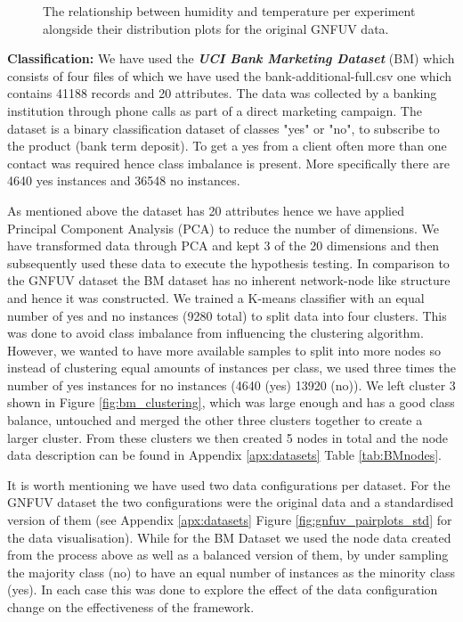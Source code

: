 \documentclass{mpaper}
\begin{document}
\begin{figure}
\begin{center}
\end{center}
\caption{\label{fig:gnfuv_pairplots} The relationship between humidity and temperature per experiment alongside their distribution plots for the original GNFUV data.}
\end{figure}


\textbf{Classification:} We have used the \textbf{\textit{UCI Bank Marketing Dataset}} (BM) \cite{BMDataset} which consists of four files of which we have used the bank-additional-full.csv one which contains 41188 records and 20 attributes. The data was collected by a banking institution through phone calls as part of a direct marketing campaign. The dataset is a binary classification dataset of classes "yes" or "no", to subscribe to the product (bank term deposit). To get a yes from a client often more than one contact was required hence class imbalance is present. More specifically there are 4640 yes instances and 36548 no instances. 

As mentioned above the dataset has 20 attributes hence we have applied Principal Component Analysis (PCA) to reduce the number of dimensions. We have transformed data through PCA and kept 3 of the 20 dimensions and then subsequently used these data to execute the hypothesis testing. In comparison to the GNFUV dataset the BM dataset has no inherent network-node like structure and hence it was constructed. We trained a K-means classifier with an equal number of yes and no instances (9280 total) to split data into four clusters. This was done to avoid class imbalance from influencing the clustering algorithm. However, we wanted to have more available samples to split into more nodes so instead of clustering equal amounts of instances per class, we used three times the number of yes instances for no instances (4640 (yes) 13920 (no)). We left cluster 3 shown in Figure \ref{fig:bm_clustering}, which was large enough and has a good class balance, untouched and merged the other three clusters together to create a larger cluster. From these clusters we then created 5 nodes in total and the node data description can be found in Appendix \ref{apx:datasets} Table \ref{tab:BMnodes}. 


It is worth mentioning we have used two data configurations per dataset. For the GNFUV dataset the two configurations were the original data and a standardised version of them (see Appendix \ref{apx:datasets} Figure \ref{fig:gnfuv_pairplots_std} for the data visualisation). While for the BM Dataset we used the node data created from the process above as well as a balanced version of them, by under sampling the majority class (no) to have an equal number of instances as the minority class (yes). In each case this was done to explore the effect of the data configuration change on the effectiveness of the framework.
\end{document}
